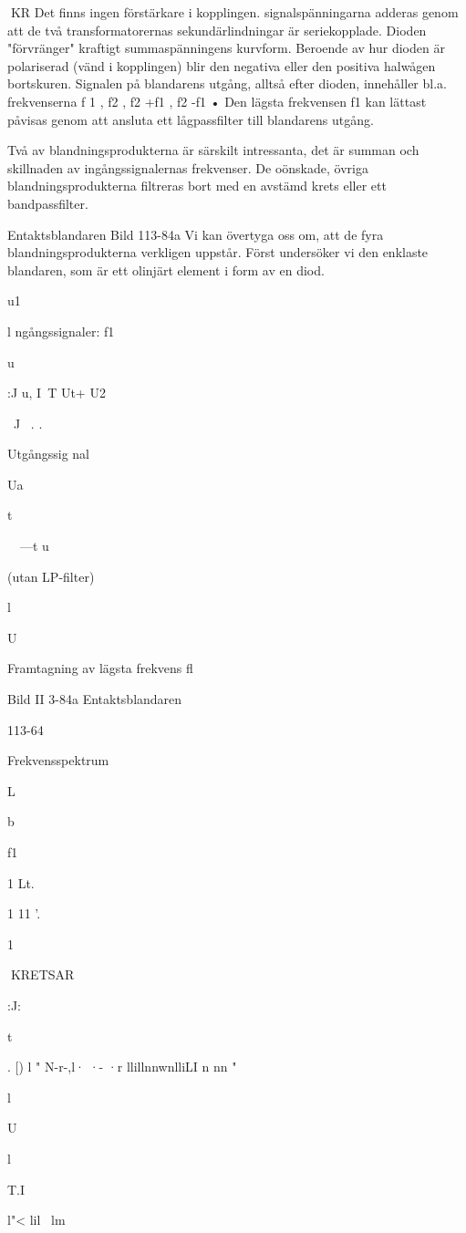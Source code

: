 {{{KR
Det finns ingen förstärkare i kopplingen.
signalspänningarna adderas genom att de
två transformatorernas sekundärlindningar
är seriekopplade. Dioden "förvränger" kraftigt summaspänningens kurvform. Beroende
av hur dioden är polariserad (vänd i kopplingen) blir den negativa eller den positiva
halwågen bortskuren.
Signalen på blandarens utgång, alltså
efter dioden, innehåller bl.a. frekvenserna f 1 ,
f2 , f2 +f1 , f2 -f1 • Den lägsta frekvensen f1 kan
lättast påvisas genom att ansluta ett lågpassfilter till blandarens utgång.

Två av blandningsprodukterna är särskilt
intressanta, det är summan och skillnaden
av ingångssignalernas frekvenser. De oönskade, övriga blandningsprodukterna filtreras bort med en avstämd krets eller ett
bandpassfilter.

Entaktsblandaren
Bild 113-84a
Vi kan övertyga oss om, att de fyra blandningsprodukterna verkligen uppstår. Först
undersöker vi den enklaste blandaren, som
är ett olinjärt element i form av en diod.

u1

l ngångssignaler:
f1

u

:J u, I~T
Ut+ U2

~J~ . .

Utgångssig nal

Ua

t

~~---t
u

(utan LP-filter)

l

U

Framtagning av lägsta frekvens fl

Bild II 3-84a Entaktsblandaren

113-64

Frekvensspektrum

L

b

f1

1 Lt.~

1 11
'.


1

KRETSAR

:J:

t

.
[) l "
N-r-,l· ·- ·r llillnnwnlliLI
n nn "

l

U

l

T.I} l"< lil~
lm~

}}
